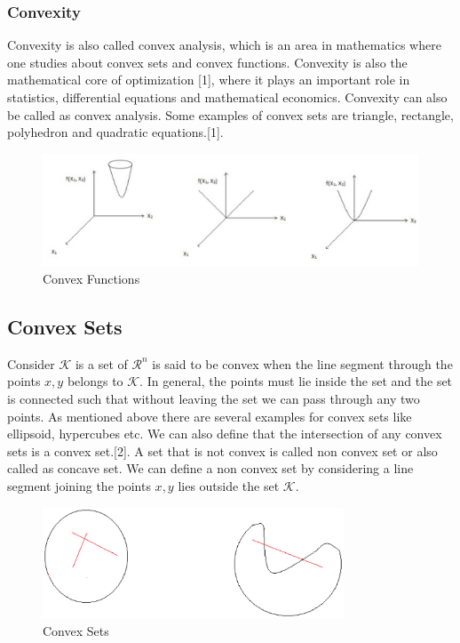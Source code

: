 \documentclass[a4paper, 12pt,titlepage]{dithesis} %
\newcommand{\me}[1]{\( #1 \)}
\begin{document}
\subsubsection{Convexity}
Convexity is also called convex analysis, which is an area in mathematics where one studies about convex sets and convex functions. Convexity is also the mathematical core of optimization [1], where it plays an important role in statistics, differential equations and mathematical economics. Convexity can also be called as convex analysis. Some examples of convex sets are triangle, rectangle, polyhedron and quadratic equations.[1]. 
\begin{figure}[h]
	\begin{center}
		\includegraphics[width= 1.0\textwidth]{convexfunc.eps}
		\caption{Convex Functions}
	\end{center}
\end{figure}
\subsection{Convex Sets}
Consider \me{\mathcal{K}} is a set of \me{\mathcal{R}^n} is said to be convex when the line segment through the points \me{x, y} belongs to \me{\mathcal{K}}. In general, the points must lie inside the set and the set is connected such that without leaving the set we can pass through any two points. As mentioned above there are several examples for convex sets like ellipsoid, hypercubes etc. We can also define that the intersection of any convex sets is a convex set.[2]. 
A set that is not convex is called non convex set or also called as concave set. We can define a non convex set by considering a line segment joining the points \me{x, y} lies outside the set \me{\mathcal{K}}.
\begin{figure}[h]
	\begin{center}
		\includegraphics[width= 0.8\textwidth]{convexset.eps}
		\caption{Convex Sets}
	\end{center}
\end{figure}
\end{document}
